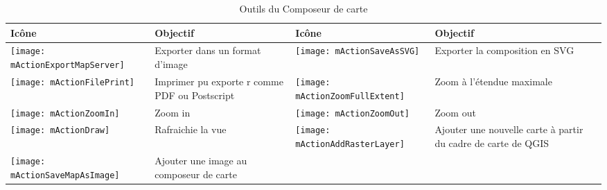 \begin{table}[h]
\centering
\caption{Outils du Composeur de carte}\label{tab:printcomposer_tools}\medskip
 \begin{tabular}{|l|p{6.9cm}|l|p{6.9cm}|}
 \hline \textbf{Icône} & \textbf{Objectif} & \textbf{Icône} &
 \textbf{Objectif} \\
 
\hline \texttt{[image: mActionExportMapServer]}  & Exporter dans un
format d'image & 
 \texttt{[image: mActionSaveAsSVG]} & Exporter la composition en 
SVG \\
 \hline \texttt{[image: mActionFilePrint]} & Imprimer pu exporte
r comme PDF ou Postscript &
\texttt{[image: mActionZoomFullExtent]} & Zoom à l'étendue
maximale\\
\hline \texttt{[image: mActionZoomIn]} & Zoom in &
 \texttt{[image: mActionZoomOut]} & Zoom out \\
 \hline \texttt{[image: mActionDraw]} & Rafraichie la vue &
 \texttt{[image: mActionAddRasterLayer]} & Ajouter une nouvelle 
carte à partir du cadre de carte de QGIS \\
 \hline \texttt{[image: mActionSaveMapAsImage]} & Ajouter une image
au composeur de carte &

\end{tabular}
\end{table}
